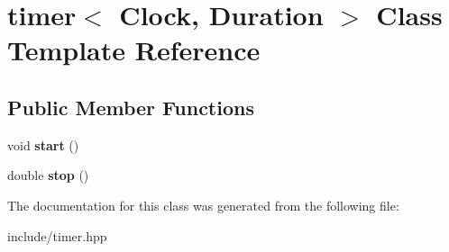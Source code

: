 \hypertarget{classtimer}{}\section{timer$<$ Clock, Duration $>$ Class Template Reference}
\label{classtimer}
\subsection*{Public Member Functions}
\begin{DoxyCompactItemize}
\item 
\mbox{\label{classtimer_a52e8bc315f5d16d70361b4917d6b6b90}} 
void {\bfseries start} ()
\item 
\mbox{\label{classtimer_aba4d20a93d34f73f3b6d728aa4054235}} 
double {\bfseries stop} ()
\end{DoxyCompactItemize}


The documentation for this class was generated from the following file\+:\begin{DoxyCompactItemize}
\item 
include/timer.\+hpp\end{DoxyCompactItemize}
